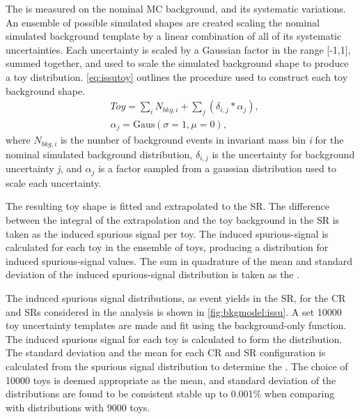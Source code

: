 The \ISSU is measured on the nominal MC background, and its systematic variations. An ensemble of possible simulated shapes are created scaling the nominal simulated background template by a linear combination of all of its systematic uncertainties. Each uncertainty is scaled by a Gaussian factor in the range [-1,1], summed together, and used to scale the simulated background shape to produce a toy distribution. \cref{eq:issutoy} outlines the procedure used to construct each toy background shape. 
\begin{equation}
    \label{eq:issutoy}
    \begin{aligned}
        & Toy = \sum_{i} N_{bkg,i} + \sum_{j} \left(\delta_{i,j} * \alpha_{j}\right), \\
        & \alpha_j = \mathrm{Gaus}(\sigma=1,\mu=0),
    \end{aligned}
\end{equation}
where $N_{bkg,i}$ is the number of background events in invariant mass bin \emph{i} for the nominal simulated background distribution, $\delta_{i,j}$ is the uncertainty for background uncertainty \emph{j}, and $\alpha_j$ is a factor sampled from a gaussian distribution used to scale each uncertainty.

The resulting toy shape is fitted and extrapolated to the SR. The difference between the integral of the extrapolation and the toy background in the SR is taken as the induced spurious signal per toy. The induced spurious-signal is calculated for each toy in the ensemble of toys, producing a distribution for induced spurious-signal values. The sum in quadrature of the mean and standard deviation of the induced spurious-signal distribution is taken as the \ISSU. 

The induced spurious signal distributions, as event yields in the SR, for the CR and SRs considered in the analysis is shown in \cref{fig:bkgmodel:issu}. A set 10000 toy uncertainty templates are made and fit using the background-only function. The induced spurious signal for each toy is calculated to form the distribution. The standard deviation and the mean for each CR and SR configuration is calculated from the spurious signal distribution to determine the \ISSU. The choice of 10000 toys is deemed appropriate as the mean, and standard deviation of the distributions are found to be consistent stable up to 0.001\% when comparing with distributions with 9000 toys.

